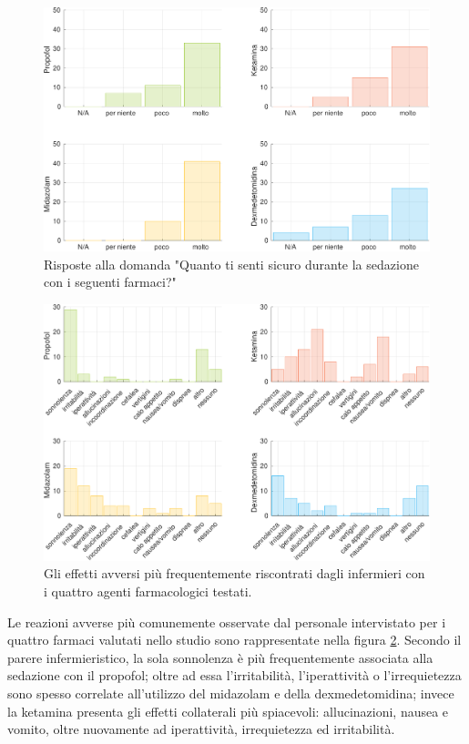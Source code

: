 \newpage

\begin{figure}[!h]
    \centering
    \includegraphics[width=1\textwidth]{Figure/sicurezza-istogrammi.pdf}
    \caption{Risposte alla domanda "Quanto ti senti sicuro durante la sedazione con i seguenti farmaci?"}
    \label{fig:sicurezza1}
\end{figure}


\begin{figure}[!h]
    \centering
    \includegraphics[width=1\textwidth]{Figure/effetti-avversi.pdf}
    \caption{Gli effetti avversi più frequentemente riscontrati dagli infermieri con i quattro agenti farmacologici testati.}
    \label{fig:sicurezza}
\end{figure}

\newpage
Le reazioni avverse più comunemente osservate dal personale intervistato per i quattro farmaci valutati nello studio sono rappresentate nella figura \ref{fig:sicurezza}. Secondo il parere infermieristico, la sola sonnolenza è più frequentemente associata alla sedazione con il propofol; oltre ad essa l'irritabilità, l'iperattività o l'irrequietezza sono spesso correlate all'utilizzo del midazolam e della dexmedetomidina; invece la ketamina presenta gli effetti collaterali più spiacevoli: allucinazioni, nausea e vomito, oltre nuovamente ad iperattività, irrequietezza ed irritabilità.

